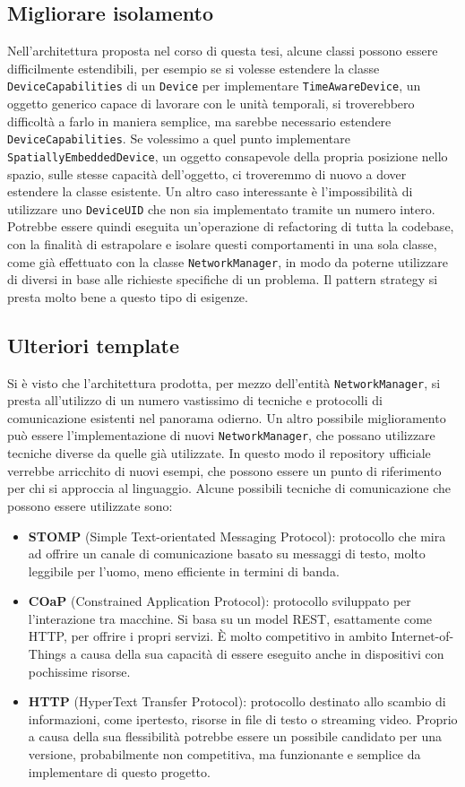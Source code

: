 \subsection{Migliorare isolamento}
Nell'architettura proposta nel corso di questa tesi, alcune classi possono
essere difficilmente estendibili, per esempio se si volesse estendere la classe
\texttt{DeviceCapabilities} di un \texttt{Device} per implementare
\texttt{TimeAwareDevice}, un oggetto generico capace di lavorare con le unità
temporali, si troverebbero difficoltà a farlo in maniera semplice, ma sarebbe
necessario estendere \texttt{DeviceCapabilities}. Se volessimo a quel punto
implementare \texttt{SpatiallyEmbeddedDevice}, un oggetto consapevole della
propria posizione nello spazio, sulle stesse capacità dell'oggetto, ci
troveremmo di nuovo a dover estendere la classe esistente. Un altro caso
interessante è l'impossibilità di utilizzare uno \texttt{DeviceUID} che non sia
implementato tramite un numero intero.  Potrebbe essere quindi eseguita
un'operazione di refactoring di tutta la codebase, con la finalità di
estrapolare e isolare questi comportamenti in una sola classe, come già
effettuato con la classe \texttt{NetworkManager}, in modo da poterne utilizzare
di diversi in base alle richieste specifiche di un problema. Il pattern strategy
si presta molto bene a questo tipo di esigenze.

\subsection{Ulteriori template}
Si è visto che l'architettura prodotta, per mezzo dell'entità
\texttt{NetworkManager}, si presta all'utilizzo di un numero vastissimo di
tecniche e protocolli di comunicazione esistenti nel panorama odierno. Un altro
possibile miglioramento può essere l'implementazione di nuovi
\texttt{NetworkManager}, che possano utilizzare tecniche diverse da quelle già
utilizzate. In questo modo il repository ufficiale verrebbe arricchito di nuovi
esempi, che possono essere un punto di riferimento per chi si approccia al
linguaggio. Alcune possibili tecniche di comunicazione che possono essere
utilizzate sono:
\begin{itemize}
\item \textbf{STOMP} (Simple Text-orientated Messaging Protocol): protocollo che
  mira ad offrire un canale di comunicazione basato su messaggi di testo, molto
  leggibile per l'uomo, meno efficiente in termini di banda.
\item \textbf{COaP} (Constrained Application Protocol): protocollo sviluppato
  per l'interazione tra macchine. Si basa su un model REST, esattamente come
  HTTP, per offrire i propri servizi. È molto competitivo in ambito
  Internet-of-Things a causa della sua capacità di essere eseguito anche in
  dispositivi con pochissime risorse.
\item \textbf{HTTP} (HyperText Transfer Protocol): protocollo destinato allo
  scambio di informazioni, come ipertesto, risorse in file di testo o streaming
  video. Proprio a causa della sua flessibilità potrebbe essere un possibile
  candidato per una versione, probabilmente non competitiva, ma funzionante e
  semplice da implementare di questo progetto.
\end{itemize}

